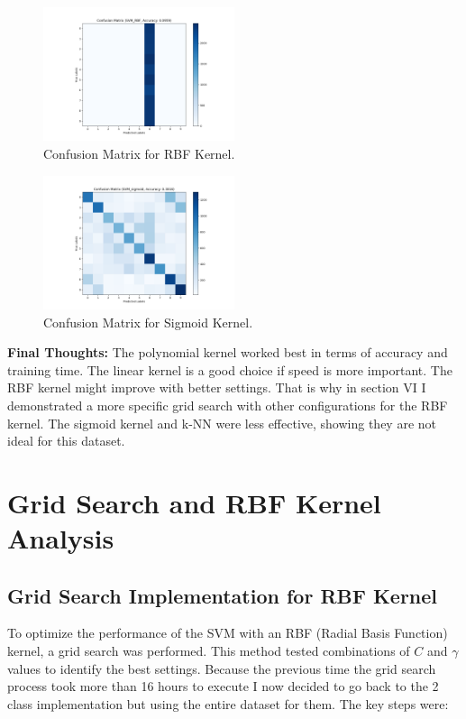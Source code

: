 \documentclass[lettersize,journal]{IEEEtran}
\begin{document}
\begin{figure}[H]
    \centering
    \includegraphics[width=0.5\textwidth]{grid_confusion_matrix_SVM_RBF.png}
    \caption{Confusion Matrix for RBF Kernel.}
    \label{fig:confusion-matrix-RBF}
\end{figure}
\begin{figure}[H]
    \centering
    \includegraphics[width=0.5\textwidth]{grid_confusion_matrix_SVM_sigmoid.png}
    \caption{Confusion Matrix for Sigmoid Kernel.}
    \label{fig:confusion-matrix-sigmoid}
\end{figure}

\vspace{0.5cm}

\textbf{Final Thoughts:}  
The polynomial kernel worked best in terms of accuracy and training time. The linear kernel is a good choice if speed is more important. The RBF kernel might improve with better settings. That is why in section VI I demonstrated a more specific grid search with other configurations for the RBF kernel. The sigmoid kernel and k-NN were less effective, showing they are not ideal for this dataset. 

\clearpage

\section{\textbf{Grid Search and RBF Kernel Analysis}}

\subsection{\textbf{Grid Search Implementation for RBF Kernel}}
To optimize the performance of the SVM with an RBF (Radial Basis Function) kernel, a grid search was performed. This method tested combinations of $C$ and $\gamma$ values to identify the best settings. Because the previous time the grid search process took more than 16 hours to execute I now decided to go back to the 2 class implementation but using the entire dataset for them. The key steps were:
\end{document}
